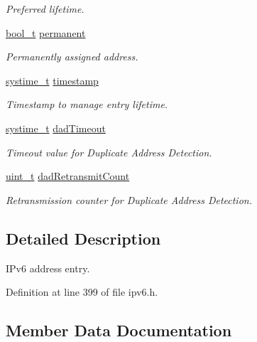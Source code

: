 \begin{DoxyCompactItemize}
\begin{DoxyCompactList}\small\item\em Preferred lifetime. \end{DoxyCompactList}\item 
\hyperlink{compiler__port_8h_a812d16e5494522586b3784e55d479912}{bool\+\_\+t} \hyperlink{structIpv6AddrEntry_a196db6647dd1196a1c3a06c8a4083a48}{permanent}
\begin{DoxyCompactList}\small\item\em Permanently assigned address. \end{DoxyCompactList}\item 
\hyperlink{compiler__port_8h_ae3e32a98d431a02106616da3071832dd}{systime\+\_\+t} \hyperlink{structIpv6AddrEntry_a9080e69e7dc724704176843cdadfb29b}{timestamp}
\begin{DoxyCompactList}\small\item\em Timestamp to manage entry lifetime. \end{DoxyCompactList}\item 
\hyperlink{compiler__port_8h_ae3e32a98d431a02106616da3071832dd}{systime\+\_\+t} \hyperlink{structIpv6AddrEntry_ae1f2402bd716fae570c797064da15807}{dad\+Timeout}
\begin{DoxyCompactList}\small\item\em Timeout value for Duplicate Address Detection. \end{DoxyCompactList}\item 
\hyperlink{compiler__port_8h_a12a1e9b3ce141648783a82445d02b58d}{uint\+\_\+t} \hyperlink{structIpv6AddrEntry_ade9430db97130475d7b1ea5f9b1880e0}{dad\+Retransmit\+Count}
\begin{DoxyCompactList}\small\item\em Retransmission counter for Duplicate Address Detection. \end{DoxyCompactList}\end{DoxyCompactItemize}


\subsection{Detailed Description}
I\+Pv6 address entry. 

Definition at line 399 of file ipv6.\+h.



\subsection{Member Data Documentation}
\mbox{\label{structIpv6AddrEntry_a55b2d1238731a3b4ffca6928ebb52fe0}} 

